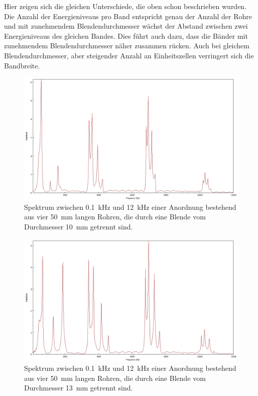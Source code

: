 Hier zeigen sich die gleichen Unterschiede, die oben schon beschrieben wurden.
Die Anzahl der Energieniveaus pro Band entspricht genau der Anzahl der Rohre und mit zunehmendem Blendendurchmesser wächst der Abstand zwischen zwei Energieniveaus des gleichen Bandes.
Dies führt auch dazu, dass die Bänder mit zunehmendem Blendendurchmesser näher zusammen rücken.
Auch bei gleichem Blendendurchmesser, aber steigender Anzahl an Einheitszellen verringert sich die Bandbreite.
\begin{figure}
\centering
\includegraphics[width=\textwidth]{content/messungen/Chapter4b/4b_4_4_10.jpg}
\caption{Spektrum zwischen 0.1~kHz und 12~kHz einer Anordnung bestehend aus vier 50~mm langen Rohren, die durch eine Blende vom Durchmesser 10~mm getrennt sind.}
\label{fig:4b_4_4_10}
\end{figure}
\begin{figure}
\centering
\includegraphics[width=\textwidth]{content/messungen/Chapter4b/4b_4_4_13.jpg}
\caption{Spektrum zwischen 0.1~kHz und 12~kHz einer Anordnung bestehend aus vier 50~mm langen Rohren, die durch eine Blende vom Durchmesser 13~mm getrennt sind.}
\label{fig:4b_4_4_13}
\end{figure}
